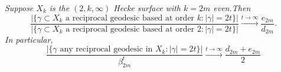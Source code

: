 \documentclass[11pt]{amsart}
\numberwithin{equation}{section}
\theoremstyle{plain}
\newtheorem{cor}[thm]{Corollary}
\begin{document}
\vskip5pt
{\it Suppose $X_{k}$ is the $(2,k,\infty)$ Hecke surface with 
$k=2m$  even.Then
\begin{equation}
\frac{\big|\{\gamma \subset X_{k} \text{ a reciprocal geodesic based at order 
$k$}: |\gamma|=2t\}\big|}{\big|\{\gamma \subset X_{k}\text{ a reciprocal geodesic based at order 
2}: |\gamma|=2t\}\big|} \xrightarrow{t\to\infty}  \frac{e_{2m}}{d_{2m}}.
\end{equation}
%
In particular, 
\begin{equation}
\frac{\big|\{\gamma \text{ any reciprocal geodesic in $X_{k}$}: |\gamma|=2t\}\big|}
{\beta_{2m}^{t}} \xrightarrow{t\to\infty} \frac{d_{2m}+e_{2m}}{2}
\end{equation}}

\end{document}
